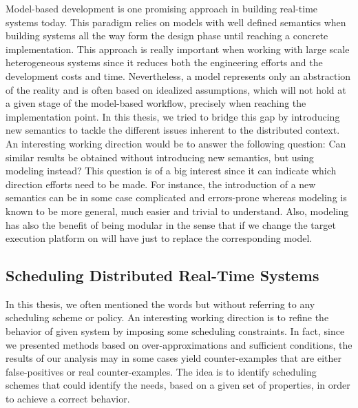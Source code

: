 Model-based development is one promising approach in building real-time systems today.
This paradigm relies on models with well defined semantics when building systems all the way
form the design phase until reaching a concrete implementation.
This approach is really important when working with large scale heterogeneous systems since
it reduces both the engineering efforts and the development costs and time.
Nevertheless, a model represents only an abstraction of the reality and is often based
on idealized assumptions, which will not hold at a given stage of the model-based workflow, 
precisely when reaching the implementation point.
In this thesis, we tried to bridge this gap by introducing new semantics to tackle the different
issues inherent to the distributed context.
An interesting working direction would be to answer the following question: 
Can similar results be obtained without introducing new semantics, but using modeling
instead? 
This question is of a big interest since it can indicate which direction efforts need to be made.
For instance, the introduction of a new semantics can be in some case complicated and 
errors-prone whereas modeling is known to be more general, much easier and trivial to understand.
Also, modeling has also the benefit of being modular in the sense that if we change 
the target execution platform on will have just to replace the corresponding model.

\subsection*{Scheduling Distributed Real-Time Systems}
In this thesis, we often mentioned the words  but without 
referring to any scheduling scheme or policy. An interesting working direction is to refine 
the behavior of given system by imposing some scheduling constraints. In fact, since we presented
methods based on over-approximations and sufficient conditions, the results of our analysis may
in some cases yield counter-examples that are either false-positives or real counter-examples.
The idea is to identify scheduling schemes that could identify the needs, based on a given set
of properties, in order to achieve a correct behavior.



